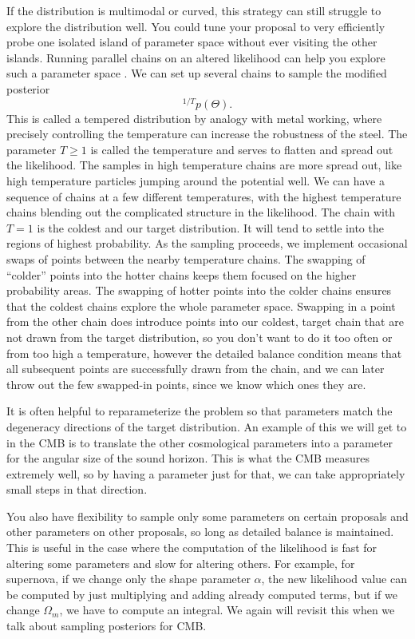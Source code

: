 If the distribution is multimodal or curved, this strategy can still struggle to explore the distribution well.  You could tune your proposal to very efficiently probe one isolated island of parameter space without ever visiting the other islands.  Running parallel chains on an altered likelihood can help you explore such a parameter space \citep{2016MNRAS.455.1919V}.  We can set up several chains to sample the modified posterior
\begin{equation} [\mathcal{L}(d|\Theta)]^{1/T}p(\Theta). \end{equation}  
This is called a tempered distribution by analogy with metal working, where precisely controlling the temperature can increase the robustness of the steel.  The parameter $T \geq 1$ is called the temperature and serves to flatten and spread out the likelihood.  The samples in high temperature chains are more spread out, like high temperature particles jumping around the potential well.  We can have a sequence of chains at a few different temperatures, with the highest temperature chains blending out the complicated structure in the likelihood.  The chain with $T=1$ is the coldest and our target distribution.  It will tend to settle into the regions of highest probability.  As the sampling proceeds, we implement occasional swaps of points between the nearby temperature chains.  The swapping of ``colder'' points into the hotter chains keeps them focused on the higher probability areas.  The swapping of hotter points into the colder chains ensures that the coldest chains explore the whole parameter space. Swapping in a point from the other chain does introduce points into our coldest, target chain that are not drawn from the target distribution, so you don't want to do it too often or from too high a temperature, however the detailed balance condition means that all subsequent points are successfully drawn from the chain, and we can later throw out the few swapped-in points, since we know which ones they are.

It is often helpful to reparameterize the problem so that parameters match the degeneracy directions of the target distribution.  An example of this we will get to in the CMB is to translate the other cosmological parameters into a parameter for the angular size of the sound horizon.  This is what the CMB measures extremely well, so by having a parameter just for that, we can take appropriately small steps in that direction.

You also have flexibility to sample only some parameters on certain proposals and other parameters on other proposals, so long as detailed balance is maintained.  This is useful in the case where the computation of the likelihood is fast for altering some parameters and slow for altering others.  For example, for supernova, if we change only the shape parameter $\alpha$, the new likelihood value can be computed by just multiplying and adding already computed terms, but if we change $\Omega_m$, we have to compute an integral.  We again will revisit this when we talk about sampling posteriors for CMB.

